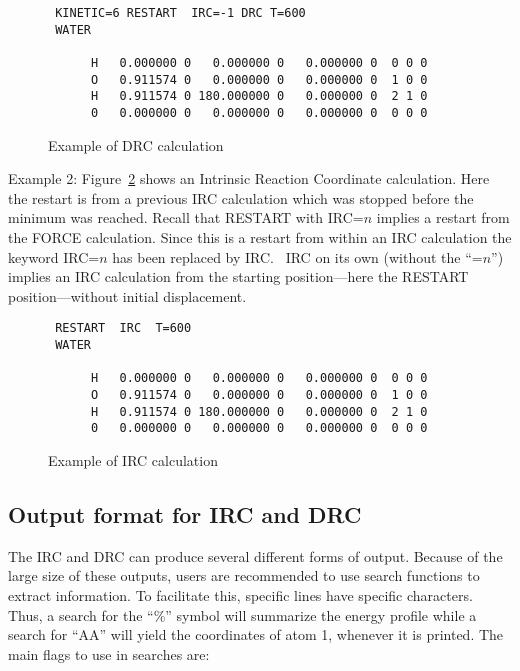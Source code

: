 \begin{figure}
\begin{makeimage}
\end{makeimage}
\begin{verbatim}
 KINETIC=6 RESTART  IRC=-1 DRC T=600
 WATER

      H   0.000000 0   0.000000 0   0.000000 0  0 0 0
      O   0.911574 0   0.000000 0   0.000000 0  1 0 0
      H   0.911574 0 180.000000 0   0.000000 0  2 1 0
      0   0.000000 0   0.000000 0   0.000000 0  0 0 0
\end{verbatim}
\caption{\label{h2odrc} Example of DRC calculation}
\end{figure}

Example 2:  Figure~\ref{h2oirc} shows an Intrinsic Reaction Coordinate
calculation.  Here the restart  is from a previous IRC calculation which was
stopped before the minimum was reached.  Recall that RESTART with IRC=$n$
implies  a  restart from  the FORCE calculation.  Since this is a restart from
within an IRC calculation the keyword IRC=$n$ has been replaced by IRC. \  IRC
on its  own (without the ``=$n$'') implies an IRC calculation from the starting
position---here the RESTART position---without initial
displacement.

\begin{figure}
\begin{makeimage}
\end{makeimage}
\begin{verbatim}
 RESTART  IRC  T=600
 WATER

      H   0.000000 0   0.000000 0   0.000000 0  0 0 0
      O   0.911574 0   0.000000 0   0.000000 0  1 0 0
      H   0.911574 0 180.000000 0   0.000000 0  2 1 0
      0   0.000000 0   0.000000 0   0.000000 0  0 0 0
\end{verbatim}
\caption{\label{h2oirc} Example of IRC calculation}
\end{figure}

\subsection*{Output format for IRC and DRC}
The IRC and DRC can produce  several  different  forms  of  output. Because of
the large size of these outputs, users are recommended to use search functions
to extract information.  To facilitate  this,  specific lines  have specific
characters.  Thus, a search for the ``\%'' symbol will summarize the energy
profile while a search  for ``AA'' will  yield  the coordinates of atom 1,
whenever it is printed.  The main flags to use in searches are:


